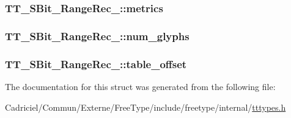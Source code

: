 \hypertarget{struct_t_t___s_bit___range_rec___a79be8a9d51100d82b2d9582db861157a}{
\subsubsection[{metrics}]{ T\-T\-\_\-\-S\-Bit\-\_\-\-Range\-Rec\-\_\-\-::metrics}}\label{struct_t_t___s_bit___range_rec___a79be8a9d51100d82b2d9582db861157a}
\hypertarget{struct_t_t___s_bit___range_rec___afd9437150f8d9f784f98da6d61223464}{
\subsubsection[{num\-\_\-glyphs}]{ T\-T\-\_\-\-S\-Bit\-\_\-\-Range\-Rec\-\_\-\-::num\-\_\-glyphs}}\label{struct_t_t___s_bit___range_rec___afd9437150f8d9f784f98da6d61223464}
\hypertarget{struct_t_t___s_bit___range_rec___a54457937305b5ccf895f5b23c0cc6006}{
\subsubsection[{table\-\_\-offset}]{ T\-T\-\_\-\-S\-Bit\-\_\-\-Range\-Rec\-\_\-\-::table\-\_\-offset}}\label{struct_t_t___s_bit___range_rec___a54457937305b5ccf895f5b23c0cc6006}


The documentation for this struct was generated from the following file\-:\begin{DoxyCompactItemize}
\item 
Cadriciel/\-Commun/\-Externe/\-Free\-Type/include/freetype/internal/\hyperlink{tttypes_8h}{tttypes.\-h}\end{DoxyCompactItemize}
